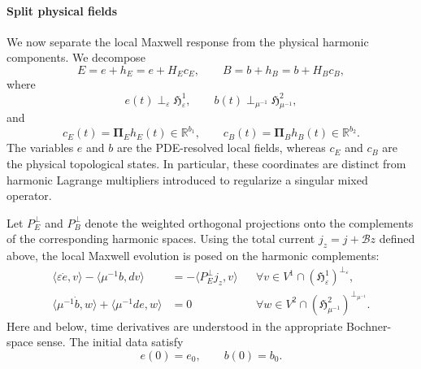 \documentclass{article}
\newcommand{\R} {\mathbb R}
\newcommand{\HH}{\mathfrak H}
\newcommand{\Piop}{\boldsymbol\Pi}
\newcommand{\ip}[2]{\langle #1,#2\rangle}
\begin{document}
\paragraph{Split physical fields}

We now separate the local Maxwell response from the physical harmonic
components. We decompose
\begin{equation}
  E=e+h_E=e+H_Ec_E,
  \qquad
  B=b+h_B=b+H_Bc_B,
\end{equation}
where
\[
  e(t)\perp_{\varepsilon}\HH^1_{\varepsilon},
  \qquad
  b(t)\perp_{\mu^{-1}}\HH^2_{\mu^{-1}},
\]
and
\[
  c_E(t)=\Piop_Eh_E(t)\in\R^{b_1},
  \qquad
  c_B(t)=\Piop_Bh_B(t)\in\R^{b_2}.
\]
The variables $e$ and $b$ are the PDE-resolved local fields, whereas
$c_E$ and $c_B$ are the physical topological states. In particular,
these coordinates are distinct from harmonic Lagrange multipliers
introduced to regularize a singular mixed operator.

Let $P_E^\perp$ and $P_B^\perp$ denote the weighted orthogonal
projections onto the complements of the corresponding harmonic spaces.
Using the total current $j_z=j+\mathcal Bz$ defined above, the local
Maxwell evolution is posed on the harmonic complements:
\begin{subequations}
\label{eq:maxwell-local-state}
\begin{align}
  \ip{\varepsilon\dot e}{v}
  -\ip{\mu^{-1}b}{dv}
  &=-\ip{P_E^\perp j_z}{v}
  &&\forall
  v\in V^1\cap(\HH^1_{\varepsilon})^{\perp_\varepsilon},
  \\
  \ip{\mu^{-1}\dot b}{w}
  +\ip{\mu^{-1}de}{w}
  &=0
  &&\forall
  w\in V^2\cap(\HH^2_{\mu^{-1}})^{\perp_{\mu^{-1}}}.
\end{align}
\end{subequations}
Here and below, time derivatives are understood in the appropriate
Bochner-space sense. The initial data satisfy
\begin{equation}
  e(0)=e_0,
  \qquad
  b(0)=b_0.
\end{equation}
\end{document}
